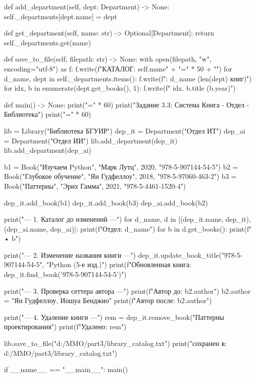 \documentclass[14pt,a4paper]{extarticle}
\begin{document}
\begin{CodeListing}
    def add_department(self, dept: Department) -> None:
        self._departments[dept.name] = dept

    def get_department(self, name: str) -> Optional[Department]:
        return self._departments.get(name)

    def save_to_file(self, filepath: str) -> None:
        with open(filepath, "w", encoding="utf-8") as f:
            f.write(f"КАТАЛОГ: {self.name}\n" + "=" * 50 + "\n")
            for d_name, dept in self._departments.items():
                f.write(f": {d_name} ({len(dept)} книг)\n")
                for idx, b in enumerate(dept.get_books(), 1):
                    f.write(f"  {idx}. {b.title} ({b.year})\n")


def main() -> None:
    print("=" * 60)
    print("Задание 3.3: Система Книга - Отдел - Библиотека")
    print("=" * 60)

    lib = Library("Библиотека БГУИР")
    dep_it = Department("Отдел ИТ")
    dep_ai = Department("Отдел ИИ")
    lib.add_department(dep_it)
    lib.add_department(dep_ai)

    b1 = Book("Изучаем Python", "Марк Лутц", 2020, "978-5-907144-54-5")
    b2 = Book("Глубокое обучение", "Ян Гудфеллоу", 2018, "978-5-97060-463-2")
    b3 = Book("Паттерны", "Эрих Гамма", 2021, "978-5-4461-1520-4")

    dep_it.add_book(b1)
    dep_it.add_book(b3)
    dep_ai.add_book(b2)

    print("\n--- 1. Каталог до изменений ---")
    for d_name, d in [(dep_it.name, dep_it), (dep_ai.name, dep_ai)]:
        print(f"Отдел: {d_name}")
        for b in d.get_books():
            print(f"  • {b}")

    print("\n--- 2. Изменение названия книги ---")
    dep_it.update_book_title("978-5-907144-54-5", "Python (5-е изд.)")
    print(f"Обновленная книга: {dep_it.find_book('978-5-907144-54-5')}")

    print("\n--- 3. Проверка сеттера автора ---")
    print(f"Автор до:    {b2.author}")
    b2.author = "Ян Гудфеллоу, Иошуа Бенджио"
    print(f"Автор после: {b2.author}")

    print("\n--- 4. Удаление книги ---")
    rem = dep_it.remove_book("Паттерны проектирования")
    print(f"Удалено: {rem}")

    lib.save_to_file("d:/MMO/part3/library_catalog.txt")
    print(" сохранен в: d:/MMO/part3/library_catalog.txt")


if __name__ == "__main__":
    main()
\end{CodeListing}
\end{document}
